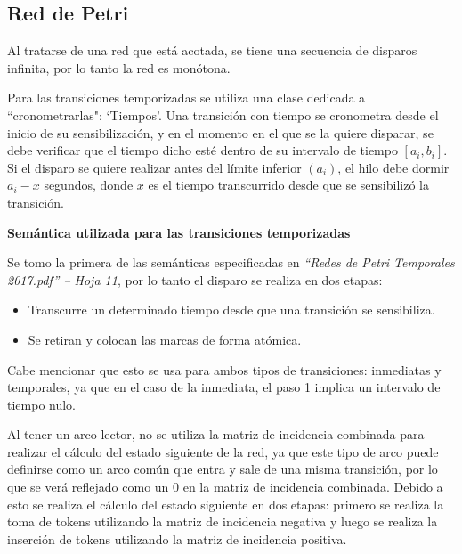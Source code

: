 \documentclass[12pt,a4paper]{article}
\begin{document}
\subsection{Red de Petri}
Al tratarse de una red que está acotada, se tiene una secuencia de disparos infinita, por lo tanto la red es monótona.

Para las transiciones temporizadas se utiliza una clase dedicada a ``cronometrarlas": ‘Tiempos’. Una transición con tiempo se cronometra desde el inicio de su sensibilización, y en el momento en el que se la quiere disparar, se debe verificar que el tiempo dicho esté dentro de su intervalo de tiempo $[a_i , b_i]$. Si el disparo se quiere realizar antes del límite inferior $(a_i)$, el hilo debe dormir $a_i-x$ segundos, donde $x$ es el tiempo transcurrido desde que se sensibilizó la transición.

\textbf{Semántica utilizada para las transiciones temporizadas}

Se tomo la primera de las semánticas especificadas en \textit{“Redes de Petri Temporales 2017.pdf” -- Hoja 11}, por lo tanto el disparo se realiza en dos etapas:
\begin{itemize}
    \item Transcurre un determinado tiempo desde que una transición se sensibiliza.
    \item Se retiran y colocan las marcas de forma atómica.
\end{itemize}

Cabe mencionar que esto se usa para ambos tipos de transiciones: inmediatas y temporales, ya que en el caso de la inmediata, el paso 1 implica un intervalo de tiempo nulo.

Al tener un arco lector, no se utiliza la matriz de incidencia combinada para realizar el cálculo del estado siguiente de la red, ya que este tipo de arco puede definirse como un arco común que entra y sale de una misma transición, por lo que se verá reflejado como un 0 en la matriz de incidencia combinada. Debido a esto se realiza el cálculo del estado siguiente en dos etapas: primero se realiza la toma de tokens utilizando la matriz de incidencia negativa y luego se realiza la inserción de tokens utilizando la matriz de incidencia positiva.
\end{document}
